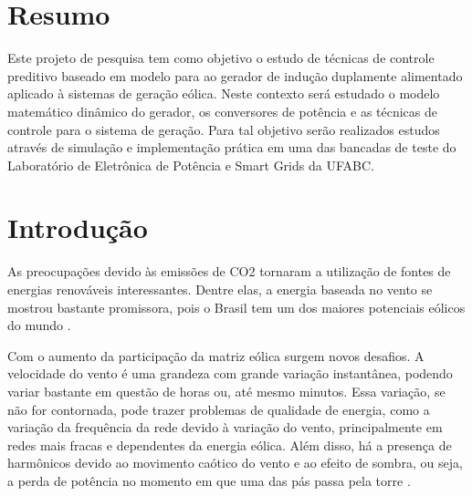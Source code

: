 	
	\begingroup
		\chapter{Resumo}
		\label{capitulo:resumo}
	\endgroup
	\setcounter{page}{1}

	Este projeto de pesquisa tem como objetivo o estudo de técnicas de controle preditivo baseado em modelo para ao gerador de indução duplamente alimentado aplicado à sistemas de geração eólica. Neste contexto será estudado o modelo matemático dinâmico do gerador, os conversores de potência e as técnicas de controle para o sistema de geração. Para tal objetivo serão realizados estudos através de simulação e implementação prática em uma das bancadas de teste do Laboratório de Eletrônica de Potência e Smart Grids da UFABC.  
	
	\begingroup
	\let\clearpage\relax
	\chapter{Introdução}
	\label{capitulo:introducao}
	\endgroup
	
	As preocupações devido às emissões de CO2 tornaram a utilização de fontes de energias renováveis interessantes. Dentre elas, a energia baseada no vento se mostrou bastante promissora, pois o Brasil tem um dos maiores potenciais eólicos do mundo \cite{atlaseolico}.
	
	Com o aumento da participação da matriz eólica surgem novos desafios. A velocidade do vento é uma grandeza com grande variação instantânea, podendo variar bastante em questão de horas ou, até mesmo minutos. Essa variação, se não for contornada, pode trazer problemas de qualidade de energia, como a variação da frequência da rede devido à variação do vento, principalmente em redes mais fracas e dependentes da energia eólica. Além disso, há a presença de harmônicos devido ao movimento caótico do vento e ao efeito de sombra, ou seja, a perda de potência no momento em que uma das pás passa pela torre \cite{pintofundamentos}.
	
